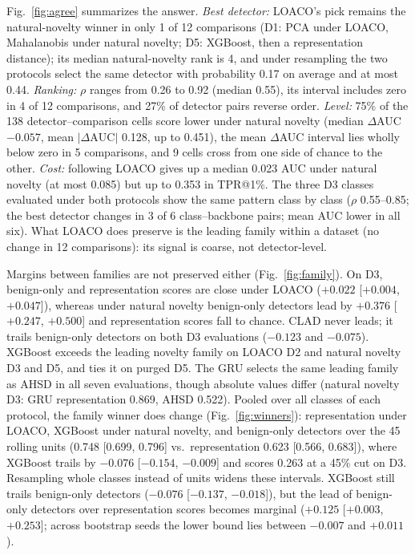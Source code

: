\documentclass[conference]{IEEEtran}
\begin{document}
Fig.~\ref{fig:agree} summarizes the answer. \emph{Best detector:} LOACO's pick remains the natural-novelty winner in only 1 of 12 comparisons (D1: PCA under LOACO, Mahalanobis under natural novelty; D5: XGBoost, then a representation distance); its median natural-novelty rank is 4, and under resampling the two protocols select the same detector with probability 0.17 on average and at most 0.44. \emph{Ranking:} $\rho$ ranges from 0.26 to 0.92 (median 0.55), its interval includes zero in 4 of 12 comparisons, and 27\% of detector pairs reverse order. \emph{Level:} 75\% of the 138 detector--comparison cells score lower under natural novelty (median $\Delta$AUC $-0.057$, mean $|\Delta\text{AUC}|$ 0.128, up to 0.451), the mean $\Delta$AUC interval lies wholly below zero in 5 comparisons, and 9 cells cross from one side of chance to the other. \emph{Cost:} following LOACO gives up a median 0.023 AUC under natural novelty (at most 0.085) but up to 0.353 in TPR@1\%. The three D3 classes evaluated under both protocols show the same pattern class by class ($\rho$ 0.55--0.85; the best detector changes in 3 of 6 class--backbone pairs; mean AUC lower in all six). What LOACO does preserve is the leading family within a dataset (no change in 12 comparisons): its signal is coarse, not detector-level.

Margins between families are not preserved either (Fig.~\ref{fig:family}). On D3, benign-only and representation scores are close under LOACO ($+0.022$ [$+0.004$, $+0.047$]), whereas under natural novelty benign-only detectors lead by $+0.376$ [$+0.247$, $+0.500$] and representation scores fall to chance. CLAD never leads; it trails benign-only detectors on both D3 evaluations ($-0.123$ and $-0.075$). XGBoost exceeds the leading novelty family on LOACO D2 and natural novelty D3 and D5, and ties it on purged D5. The GRU selects the same leading family as AHSD in all seven evaluations, though absolute values differ (natural novelty D3: GRU representation 0.869, AHSD 0.522). Pooled over all classes of each protocol, the family winner does change (Fig.~\ref{fig:winners}): representation under LOACO, XGBoost under natural novelty, and benign-only detectors over the 45 rolling units (0.748 [0.699, 0.796] vs.\ representation 0.623 [0.566, 0.683]), where XGBoost trails by $-0.076$ [$-0.154$, $-0.009$] and scores 0.263 at a 45\% cut on D3. Resampling whole classes instead of units widens these intervals. XGBoost still trails benign-only detectors ($-0.076$ [$-0.137$, $-0.018$]), but the lead of benign-only detectors over representation scores becomes marginal ($+0.125$ [$+0.003$, $+0.253$]; across bootstrap seeds the lower bound lies between $-0.007$ and $+0.011$).
\end{document}

